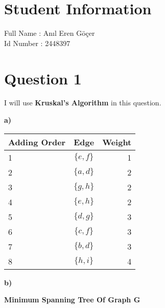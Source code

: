 \documentclass[11pt]{article}
\begin{document}
\section*{Student Information } 
Full Name : Anıl Eren Göçer \\
Id Number : 2448397  \\

\section*{Question 1}

I will use \textbf{Kruskal's Algorithm} in this question. \newline \newline

\noindent \textbf{a)} \newline \newline



\begin{table}[h!]
  \begin{center}
    \label{tab:table1}
    \begin{tabular}{l|c|r} %
      \textbf{Adding Order} & \textbf{Edge} & \textbf{Weight}\\
      \hline
      1 & $\{e,f\}$ & 1\\ 
      2 & $\{a,d\}$ & 2\\ 
      3 & $\{g,h\}$ & 2\\
      4 & $\{e,h\}$ & 2\\ 
      5 & $\{d,g\}$ & 3\\ 
      6 & $\{c,f\}$ & 3\\ 
      7 & $\{b,d\}$ & 3\\ 
      8 & $\{h,i\}$ & 4\\ 
    \end{tabular}
  \end{center}
\end{table}

\noindent \textbf{b)} \newline 

\begin{center}
    \textbf{Minimum Spanning Tree Of Graph G}
\end{center}
\end{document}
